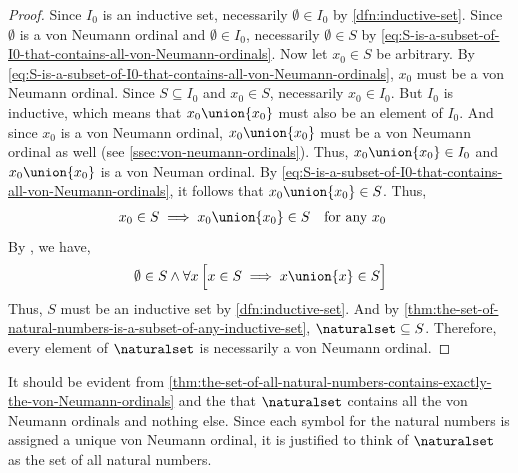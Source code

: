 \begin{proof}
    \vspace{0.3cm}
    \noindent
    Since \( I_{0} \) is an inductive set, necessarily \( \emptyset \in I_{0} \) by \cref{dfn:inductive-set}. Since \( \emptyset  \)
    is a von Neumann ordinal and \( \emptyset \in I_{0} \), necessarily \( \emptyset \in S \)
    by \eqref{eq:S-is-a-subset-of-I0-that-contains-all-von-Neumann-ordinals}.
    Now let \( x_{0} \in S \) be arbitrary. By \eqref{eq:S-is-a-subset-of-I0-that-contains-all-von-Neumann-ordinals},
    \( x_{0} \) must be a von Neumann ordinal. Since \( S \subseteq I_{0} \) and
    \( x_{0} \in S \), necessarily \( x_{0} \in I_{0} \). But \( I_{0} \) is inductive, which means that \( x_{0} \union \mleft\{ x_{0} \mright\} \) must
    also be an element of \( I_{0} \). And since \( x_{0} \) is a von Neumann ordinal, \( x_{0} \union \mleft\{ x_{0} \mright\} \) must
    be a von Neumann ordinal as well (see \cref{ssec:von-neumann-ordinals}). Thus, \( x_{0} \union \mleft\{ x_{0} \mright\} \in I_{0} \) and
    \( x_{0} \union \mleft\{ x_{0} \mright\} \) is a von Neuman ordinal. By \eqref{eq:S-is-a-subset-of-I0-that-contains-all-von-Neumann-ordinals},
    it follows that \( x_{0} \union \mleft\{ x_{0} \mright\} \in S \). Thus,
    \begin{equation*}
        \begin{aligned}
            x_{0} \in S \implies x_{0} \union \mleft\{ x_{0} \mright\} \in S&
        \end{aligned}
        \begin{aligned}
            &\text{for any \( x_{0} \)}
        \end{aligned}
    \end{equation*}
    By , we have,
    \begin{equation*}
        \emptyset \in S \land \forall x \, \Big[ x \in S \implies x \union \mleft\{ x \mright\} \in S \Big]
    \end{equation*}
    Thus, \( S \) must be an inductive set by \cref{dfn:inductive-set}.
    And by \cref{thm:the-set-of-natural-numbers-is-a-subset-of-any-inductive-set}, \( \naturalset \subseteq S \). Therefore,
    every element of \( \naturalset \) is necessarily a von Neumann ordinal.
\end{proof}

\begin{rem}
    It should be evident from \cref{thm:the-set-of-all-natural-numbers-contains-exactly-the-von-Neumann-ordinals} and
    the  that \( \naturalset \) contains all the von Neumann ordinals and
    nothing else. Since each symbol for the natural numbers is assigned a unique von Neumann ordinal,
    it is justified to think of \( \naturalset \) as the set of all natural numbers.
\end{rem}

